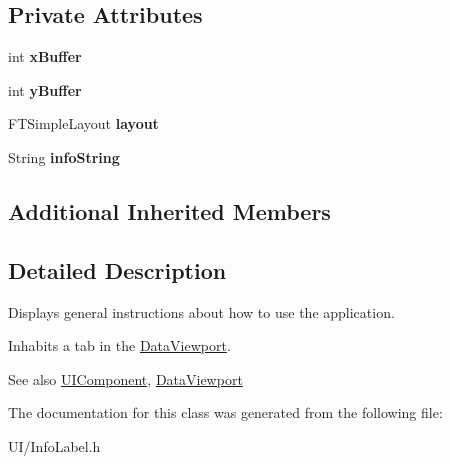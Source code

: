 \subsection*{Private Attributes}
\begin{DoxyCompactItemize}
\item 
\hypertarget{classInfoLabel_a582db0e12e0a3a365b01163e58e0ba3f}{int {\bfseries x\-Buffer}}\label{classInfoLabel_a582db0e12e0a3a365b01163e58e0ba3f}

\item 
\hypertarget{classInfoLabel_a287a6f4f7b22b2c42d8cafef1531fb40}{int {\bfseries y\-Buffer}}\label{classInfoLabel_a287a6f4f7b22b2c42d8cafef1531fb40}

\item 
\hypertarget{classInfoLabel_ac413074578bd7931adf1ec946e6dc191}{F\-T\-Simple\-Layout {\bfseries layout}}\label{classInfoLabel_ac413074578bd7931adf1ec946e6dc191}

\item 
\hypertarget{classInfoLabel_a58b89957e778c566710f9d961f775b01}{String {\bfseries info\-String}}\label{classInfoLabel_a58b89957e778c566710f9d961f775b01}

\end{DoxyCompactItemize}
\subsection*{Additional Inherited Members}


\subsection{Detailed Description}
Displays general instructions about how to use the application.

Inhabits a tab in the \hyperlink{classDataViewport}{Data\-Viewport}.

\begin{DoxySeeAlso}{See also}
\hyperlink{classUIComponent}{U\-I\-Component}, \hyperlink{classDataViewport}{Data\-Viewport} 
\end{DoxySeeAlso}


The documentation for this class was generated from the following file\-:\begin{DoxyCompactItemize}
\item 
U\-I/Info\-Label.\-h\end{DoxyCompactItemize}
